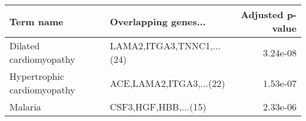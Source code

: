\begin{tabular}{llr}
\toprule
                  Term name &      Overlapping genes... &  Adjusted p-value \\
\midrule
     Dilated cardiomyopathy & LAMA2,ITGA3,TNNC1,...(24) &          3.24e-08 \\
Hypertrophic cardiomyopathy &   ACE,LAMA2,ITGA3,...(22) &          1.53e-07 \\
                    Malaria &      CSF3,HGF,HBB,...(15) &          2.33e-06 \\
\bottomrule
\end{tabular}
